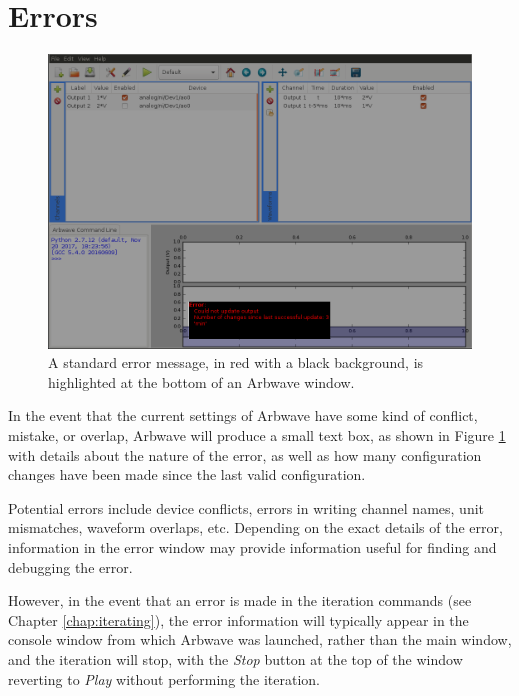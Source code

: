 \section{Errors}

\begin{figure}[hb!]
  \centerline{\includegraphics[width=.8\textwidth]{figures/arbwave_error}}
  \caption{A standard error message, in red with a black background, is 
  highlighted at the bottom of an Arbwave window.}
  \label{fig:quick:arbwave_error}
\end{figure}

In the event that the current settings of Arbwave have some kind of conflict,
mistake, or overlap, Arbwave will produce a small text box, as shown in Figure
\ref{fig:quick:arbwave_error} with details about the nature of the error, as
well as how many configuration changes have been made since the last valid
configuration.

Potential errors include device conflicts, errors in writing channel names,
unit mismatches, waveform overlaps, etc.  Depending on the exact details of the
error, information in the error window may provide information useful for
finding and debugging the error.  

However, in the event that an error is made in
the iteration commands (see Chapter \ref{chap:iterating}), the error information
will typically appear in the console window from which Arbwave was launched, 
rather than the main window,
and the iteration will stop, with the \textit{Stop} button at the top of the
window reverting to \textit{Play} without performing the iteration.
